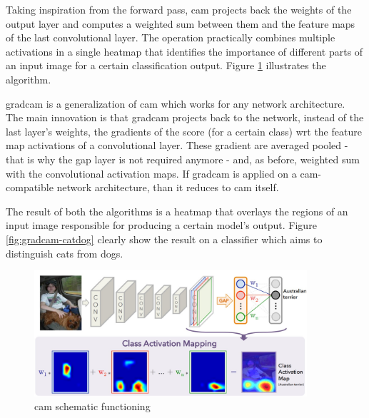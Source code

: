 Taking inspiration from the forward pass, \gls{cam} projects back the weights of the output layer and computes a weighted sum between them and the feature maps of the last convolutional layer. The operation practically combines multiple activations in a single heatmap that identifies the importance of different parts of an input image for a certain classification output. Figure \ref{fig:cam-schema} illustrates the algorithm. 

\medskip

\gls{gradcam} is a generalization of \gls{cam} which works for any network architecture. The main innovation is that \gls{gradcam} projects back to the network, instead of the last layer's weights, the gradients of the score (for a certain class) \gls{wrt} the feature map activations of a convolutional layer. These gradient are averaged pooled - that is why the \gls{gap} layer is not required anymore - and, as before, weighted sum with the convolutional activation maps. If \gls{gradcam} is applied on a \gls{cam}-compatible network architecture, than it reduces to \gls{cam} itself.

The result of both the algorithms is a heatmap that overlays the regions of an input image responsible for producing a certain model's output. Figure \ref{fig:gradcam-catdog} clearly show the result on a classifier which aims to distinguish cats from dogs.

\begin{figure}[!htb]
	\centering
	\includegraphics[width=0.9\textwidth]{"contents/images/02-cam"}
	\caption[\gls{cam} schematic functioning]{\gls{cam} schematic functioning \cite{zhou2015learning}}
	\label{fig:cam-schema}
\end{figure}


